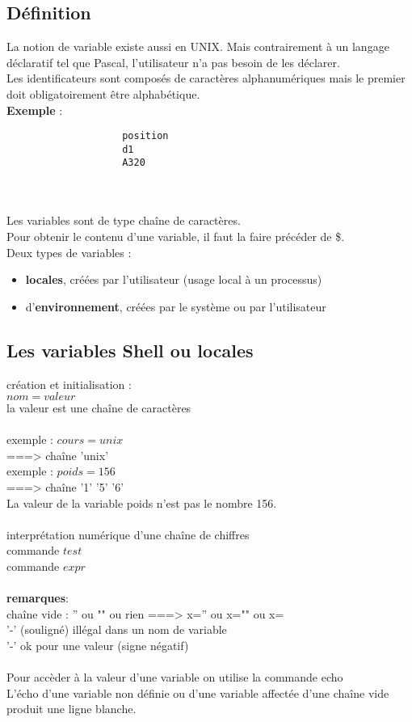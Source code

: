 			\subsection{Définition}
				La notion de variable existe aussi en UNIX. Mais contrairement à un langage déclaratif tel que Pascal, l'utilisateur n'a pas besoin de les déclarer.\\ 
				Les identificateurs sont composés de caractères alphanumériques mais le premier doit obligatoirement être alphabétique.\\
				\textbf{Exemple} :
				\begin{verbatim}	
					position 
					d1
					A320
				\end{verbatim}\\ \\

				Les variables sont de type chaîne de caractères. \\
				Pour obtenir le contenu d'une variable, il faut la faire précéder de \$. \\
				Deux types de variables :\\
				\begin{itemize}	
					\item \textbf{locales}, créées par l'utilisateur (usage local à un processus)
				 	\item d'\textbf{environnement}, créées par le système ou par l'utilisateur
				 \end{itemize}
			\subsection{Les variables Shell ou locales}
				création et initialisation : \\
				$nom=valeur$\\
				la valeur est une chaîne de caractères \\ \\
				exemple : $cours=unix$\\
				===> chaîne 'unix' \\
				exemple : $poids=156$\\
				===> chaîne '1' '5' '6'\\ 
				La valeur de la variable poids n'est pas le nombre 156.\\ \\
				interprétation numérique d'une chaîne de chiffres\\
				commande $test$\\
				commande $expr$\\ \\
				\textbf{remarques}:\\
				chaîne vide : '' ou "" ou rien ===> x='' ou x="" ou x= \\
				'-' (souligné) illégal dans un nom de variable\\
				'-' ok pour une valeur (signe négatif)\\ \\
				Pour accèder à la valeur d'une variable on utilise la commande echo\\
				L'écho d'une variable non définie ou d'une variable affectée d'une chaîne vide produit une ligne blanche.\\
